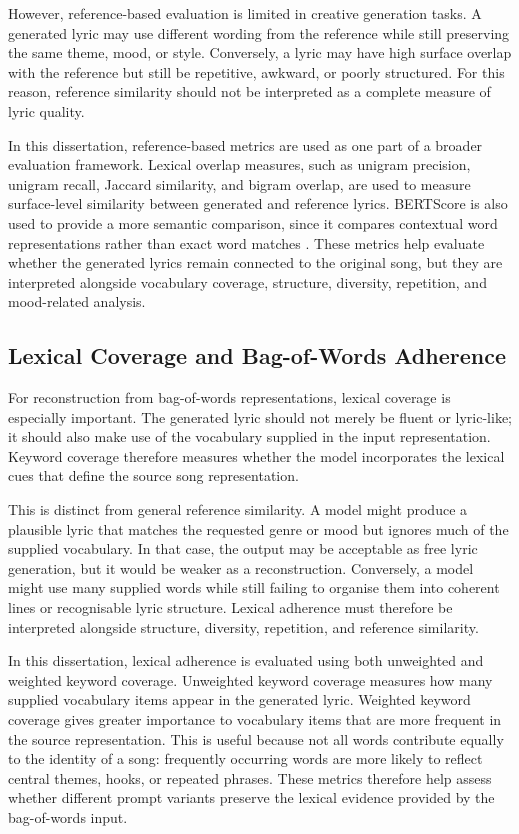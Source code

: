 However, reference-based evaluation is limited in creative generation tasks. A generated lyric may use different wording from the reference while still preserving the same theme, mood, or style. Conversely, a lyric may have high surface overlap with the reference but still be repetitive, awkward, or poorly structured. For this reason, reference similarity should not be interpreted as a complete measure of lyric quality.

In this dissertation, reference-based metrics are used as one part of a broader evaluation framework. Lexical overlap measures, such as unigram precision, unigram recall, Jaccard similarity, and bigram overlap, are used to measure surface-level similarity between generated and reference lyrics. BERTScore is also used to provide a more semantic comparison, since it compares contextual word representations rather than exact word matches \cite{zhang2020bertscore}. These metrics help evaluate whether the generated lyrics remain connected to the original song, but they are interpreted alongside vocabulary coverage, structure, diversity, repetition, and mood-related analysis.

\subsection{Lexical Coverage and Bag-of-Words Adherence}

For reconstruction from bag-of-words representations, lexical coverage is especially important. The generated lyric should not merely be fluent or lyric-like; it should also make use of the vocabulary supplied in the input representation. Keyword coverage therefore measures whether the model incorporates the lexical cues that define the source song representation.

This is distinct from general reference similarity. A model might produce a plausible lyric that matches the requested genre or mood but ignores much of the supplied vocabulary. In that case, the output may be acceptable as free lyric generation, but it would be weaker as a reconstruction. Conversely, a model might use many supplied words while still failing to organise them into coherent lines or recognisable lyric structure. Lexical adherence must therefore be interpreted alongside structure, diversity, repetition, and reference similarity.

In this dissertation, lexical adherence is evaluated using both unweighted and weighted keyword coverage. Unweighted keyword coverage measures how many supplied vocabulary items appear in the generated lyric. Weighted keyword coverage gives greater importance to vocabulary items that are more frequent in the source representation. This is useful because not all words contribute equally to the identity of a song: frequently occurring words are more likely to reflect central themes, hooks, or repeated phrases. These metrics therefore help assess whether different prompt variants preserve the lexical evidence provided by the bag-of-words input.

